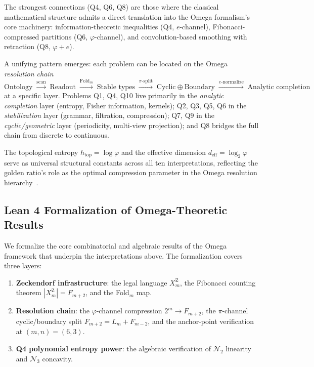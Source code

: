 \noindent
The strongest connections (Q4, Q6, Q8) are those where the classical
mathematical structure admits a direct translation into the Omega
formalism's core machinery: information-theoretic inequalities
(Q4, $e$-channel), Fibonacci-compressed partitions (Q6, $\varphi$-channel),
and convolution-based smoothing with retraction (Q8, $\varphi{+}e$).

A unifying pattern emerges: each problem can be located on the
Omega \emph{resolution chain}
\[
\text{Ontology} \;\xrightarrow{\text{scan}}\;
\text{Readout}\;\xrightarrow{\text{Fold}_m}\;
\text{Stable types}\;\xrightarrow{\text{$\pi$-split}}\;
\text{Cyclic}\oplus\text{Boundary}
\;\xrightarrow{\text{$e$-normalize}}\;
\text{Analytic completion}
\]
at a specific layer.  Problems Q1, Q4, Q10 live primarily in the
\emph{analytic completion} layer (entropy, Fisher information, kernels);
Q2, Q3, Q5, Q6 in the \emph{stabilization} layer (grammar, filtration,
compression); Q7, Q9 in the \emph{cyclic/geometric} layer
(periodicity, multi-view projection); and Q8 bridges the full chain
from discrete to continuous.

The topological entropy $h_{\mathrm{top}}=\log\varphi$
and the effective dimension $d_{\mathrm{eff}}=\log_2\varphi$
serve as universal structural constants across all ten interpretations,
reflecting the golden ratio's role as the optimal compression parameter
in the Omega resolution hierarchy~\cite{omega-theory,omega-fop}.


\subsection{Lean 4 Formalization of Omega-Theoretic Results}

We formalize the core combinatorial and algebraic results of the
Omega framework that underpin the interpretations above.
The formalization covers three layers:
\begin{enumerate}[nosep]
\item \textbf{Zeckendorf infrastructure}: the legal language
  $X_m^{\mathrm Z}$, the Fibonacci counting theorem
  $|X_m^{\mathrm Z}|=F_{m+2}$, and the Fold$_m$ map.
\item \textbf{Resolution chain}: the $\varphi$-channel compression
  $2^m\to F_{m+2}$, the $\pi$-channel cyclic/boundary split
  $F_{m+2}=L_m+F_{m-2}$, and the anchor-point verification
  at $(m,n)=(6,3)$.
\item \textbf{Q4 polynomial entropy power}: the algebraic verification
  of $\mathcal N_2$ linearity and $\mathcal N_3$ concavity.
\end{enumerate}

